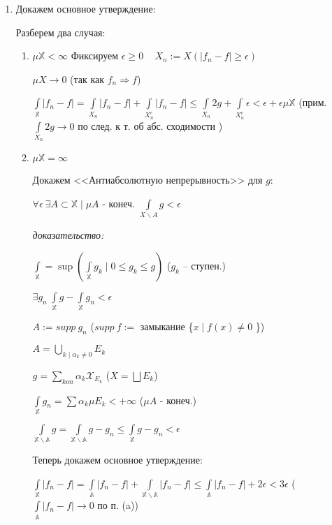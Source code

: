 \documentclass[paper=a4, fontsize=13.2pt]{article}
\begin{document}
\begin{flushleft}
\begin{enumerate}
	\item Докажем основное утверждение: 
	
	Разберем два случая: 
	\begin{enumerate}
		\item $ \mu \mathbb{X} < \infty $
		Фиксируем $ \epsilon \ge 0 $ ~ $ X_n := X(|f_n - f| \geq \epsilon) $
		
		$ \mu X \rightarrow 0 $ (так как $ f_n \Rightarrow f $)
	
		$ \int\limits_{\mathbb{X}} |f_n - f| = 
		\int\limits_{X_n} |f_n - f| + \int\limits_{X_n^c} |f_n - f| \leq 
		\int\limits_{X_n} 2g + \int\limits_{X_n^c} \epsilon < \epsilon + \epsilon \mu \mathbb{X} $ (прим. $ \int\limits_{X_n} 2g \rightarrow 0 $ по след. к т. об абс. сходимости )
	
		\item $ \mu \mathbb{X} = \infty $
	
		Докажем <<Антиабсолютную непрерывность>> для $ g $: 
		
		$ \forall \epsilon ~ \exists A \subset \mathbb{X} \mid \mu A$ - конеч. 
		$ \int\limits_{X\backslash A} g < \epsilon $
		
		\textit{доказательство:} 
		
		$ \int\limits_{\mathbb{X}} = \sup ( \int\limits_{\mathbb{X}} g_k \mid 0 \leq g_k \leq g) $ ($ g_k $ -- ступен.)
		
		$ \exists g_n ~ \int\limits_{\mathbb{X}} g - \int\limits_{\mathbb{X}} g_n < \epsilon $
	
		$ A:= supp\ g_n $ ($ supp\ f := $ замыкание \{$ x \mid f(x) \neq 0$ \})
		
		$ A =  \bigcup\limits_{k \mid \alpha_k \neq 0} E_k $
		
		$ g = \sum\limits_{kon} \alpha_k \mathcal{X}_{E_k} $ ($ X = \bigsqcup E_k $)
		
		$ \int\limits_{\mathbb{X}} g_n  = \sum \alpha_k \mu E_k  < +\infty $ ($ \mu A $ - конеч.)
		
		$ \int\limits_{\mathbb{X\backslash A}} g = 
		\int\limits_{\mathbb{X\backslash A}} g - g_n \leq 
		\int\limits_{\mathbb{X}} g - g_n < \epsilon $ 
	
		Теперь докажем основное утверждение: 
		
		 $ \int\limits_{\mathbb{X}} |f_n - f| = 
		 \int\limits_{\mathbb{A}} |f_n - f| + \int\limits_{\mathbb{X\backslash A}} |f_n - f| \leq 
		 \int\limits_{\mathbb{A}} |f_n - f| + 2\epsilon < 3 \epsilon $ 
		 ($  \int\limits_{\mathbb{A}} |f_n - f| \rightarrow 0$  по п. (a))
	\end{enumerate}
\end{enumerate}
\end{flushleft}
\end{document}
